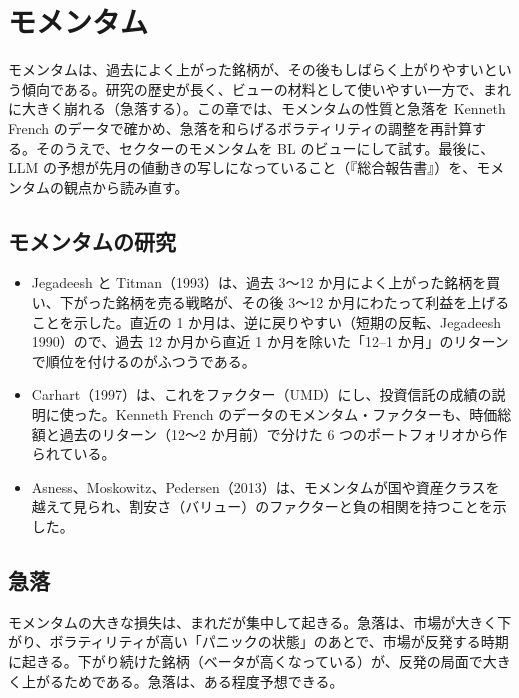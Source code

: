 \chapter{モメンタム}\label{ch:momentum}

モメンタムは、過去によく上がった銘柄が、その後もしばらく上がりやすいという傾向である。研究の歴史が長く、ビューの材料として使いやすい一方で、まれに大きく崩れる（急落する）。この章では、モメンタムの性質と急落を Kenneth French のデータで確かめ、急落を和らげるボラティリティの調整を再計算する。そのうえで、セクターのモメンタムを BL のビューにして試す。最後に、LLM の予想が先月の値動きの写しになっていること（『総合報告書』）を、モメンタムの観点から読み直す。

\section{モメンタムの研究}

\begin{itemize}
\item Jegadeesh と Titman（1993）は、過去 3〜12 か月によく上がった銘柄を買い、下がった銘柄を売る戦略が、その後 3〜12 か月にわたって利益を上げることを示した。直近の 1 か月は、逆に戻りやすい（短期の反転、Jegadeesh 1990）ので、過去 12 か月から直近 1 か月を除いた「12--1 か月」のリターンで順位を付けるのがふつうである。
\item Carhart（1997）は、これをファクター（UMD）にし、投資信託の成績の説明に使った。Kenneth French のデータのモメンタム・ファクターも、時価総額と過去のリターン（12〜2 か月前）で分けた 6 つのポートフォリオから作られている。
\item Asness、Moskowitz、Pedersen（2013）は、モメンタムが国や資産クラスを越えて見られ、割安さ（バリュー）のファクターと負の相関を持つことを示した。
\end{itemize}

\section{急落}

\begin{paperbox}
モメンタムの大きな損失は、まれだが集中して起きる。急落は、市場が大きく下がり、ボラティリティが高い「パニックの状態」のあとで、市場が反発する時期に起きる。下がり続けた銘柄（ベータが高くなっている）が、反発の局面で大きく上がるためである。急落は、ある程度予想できる。
\end{paperbox}

